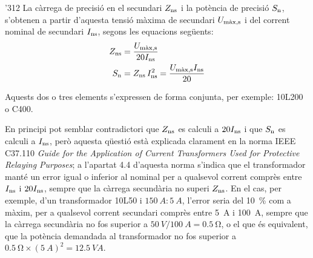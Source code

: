 \begin{dingautolist}{'312}
    La càrrega de precisió en el secundari
    $Z_\mathrm{ns}$ i la potència de precisió $S_\mathrm{n}$, s'obtenen a partir d'aquesta
    tensió màxima de secundari $U_\mathrm{m\grave{a}x,s}$
    i del corrent     nominal de secundari $I_\mathrm{ns}$, segons les equacions següents:
    \begin{align}
        Z_\mathrm{ns} &= \frac{U_\mathrm{m\grave{a}x,s}}{20 I_\mathrm{ns}}\\
        S_\mathrm{n} &= Z_\mathrm{ns} \,I_\mathrm{ns}^2 = \frac{U_\mathrm{m\grave{a}x,s} I_\mathrm{ns}}{20}
        \label{eq:sn_ti_ieee}
    \end{align}
\end{dingautolist}

Aquests dos o tres elements s'expressen de forma conjunta, per exemple:
10L200 o C400.

En principi pot semblar contradictori que $Z_\mathrm{ns}$ es calculi a $20 I_\mathrm{ns}$ i que $S_\mathrm{n}$ es calculi a $I_\mathrm{ns}$, però aquesta qüestió està explicada clarament en la norma IEEE C37.110 \textit{ Guide for the Application of Current Transformers Used for Protective Relaying Purposes}; a l'apartat 4.4 d'aquesta norma s'indica que el transformador manté un error igual o inferior al nominal per a qualsevol corrent comprès entre $I_\mathrm{ns}$ i $20 I_\mathrm{ns}$, sempre que la càrrega secundària no superi $Z_\mathrm{ns}$. En el cas, per exemple, d'un transformador 10L50 i $\qty{150}{A}\!:\!\qty{5}{A}$, l'error seria del \qty{10}{\percent} com a màxim, per a qualsevol corrent  secundari comprès entre \qty{5}{A} i \qty{100}{A}, sempre que la càrrega secundària no fos superior a $\qty{50}{V} / \qty{100}{A}= \qty{0,5}{\ohm}$, o el que és equivalent, que la potència  demandada al transformador no fos superior a $\qty{0,5}{\ohm} \times (\qty{5}{A})^2 = \qty{12,5}{VA}$.


